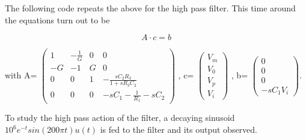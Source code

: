 \documentclass[a4paper, 12pt, margin= 1.25cm]{article}
\begin{document}
    The following code repeats the above for the high pass filter. This time
around the equations turn out to be

\begin{equation}
A\cdot c = b
\end{equation}

with A=
$\left( \begin{matrix} 1 & -\frac{1}{G} & 0 & 0 \\ -G & -1 & G & 0 \\  0 & 0 & 1 & -\frac{sC_2R_3}{1+sR_3C_2}  \\ 0 & 0 & 0 & -sC_1 - \frac{1}{R_1} - sC_2 \end{matrix} \right)$
, c=
$\left( \begin{matrix} V_m  \\ V_0  \\ V_p  \\ V_i  \end{matrix} \right)$
, b=
$\left( \begin{matrix} 0  \\ 0  \\ 0  \\ -sC_1V_i  \end{matrix} \right)$.

To study the high pass action of the filter, a decaying sinusoid
$10^6e^{-t}sin(200 \pi t) u(t)$ is fed to the filter and its output
observed.
\end{document}

